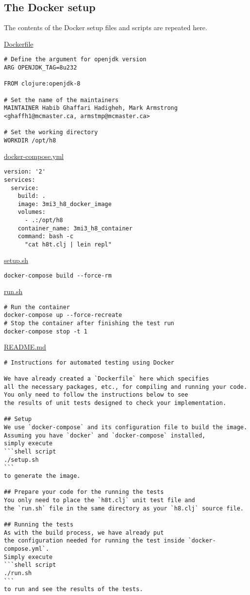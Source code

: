\documentclass[11pt]{article}
\begin{document}
\subsection*{The Docker setup}
\label{sec:org7c81111}
The contents of the Docker setup files and scripts are repeated here.

\href{./testing/h7/Dockerfile}{Dockerfile}
\begin{verbatim}
# Define the argument for openjdk version
ARG OPENJDK_TAG=8u232

FROM clojure:openjdk-8
    
# Set the name of the maintainers
MAINTAINER Habib Ghaffari Hadigheh, Mark Armstrong <ghaffh1@mcmaster.ca, armstmp@mcmaster.ca>

# Set the working directory
WORKDIR /opt/h8
\end{verbatim}

\href{./testing/h7/docker-compose.yml}{docker-compose.yml}
\begin{verbatim}
version: '2'
services:
  service:
    build: .
    image: 3mi3_h8_docker_image
    volumes:
      - .:/opt/h8
    container_name: 3mi3_h8_container
    command: bash -c
      "cat h8t.clj | lein repl"
\end{verbatim}

\href{./testing/h5/setup.sh}{setup.sh}
\begin{verbatim}
docker-compose build --force-rm
\end{verbatim}

\href{./testing/h5/run.sh}{run.sh}
\begin{verbatim}
# Run the container
docker-compose up --force-recreate
# Stop the container after finishing the test run
docker-compose stop -t 1
\end{verbatim}

\href{./testing/h5/README.md}{README.md}
\begin{verbatim}
# Instructions for automated testing using Docker

We have already created a `Dockerfile` here which specifies
all the necessary packages, etc., for compiling and running your code.
You only need to follow the instructions below to see 
the results of unit tests designed to check your implementation.

## Setup
We use `docker-compose` and its configuration file to build the image.
Assuming you have `docker` and `docker-compose` installed,
simply execute
```shell script
./setup.sh
```
to generate the image.

## Prepare your code for the running the tests
You only need to place the `h8t.clj` unit test file and
the `run.sh` file in the same directory as your `h8.clj` source file.

## Running the tests
As with the build process, we have already put
the configuration needed for running the test inside `docker-compose.yml`.
Simply execute
```shell script
./run.sh
```
to run and see the results of the tests.
\end{verbatim}
\end{document}
